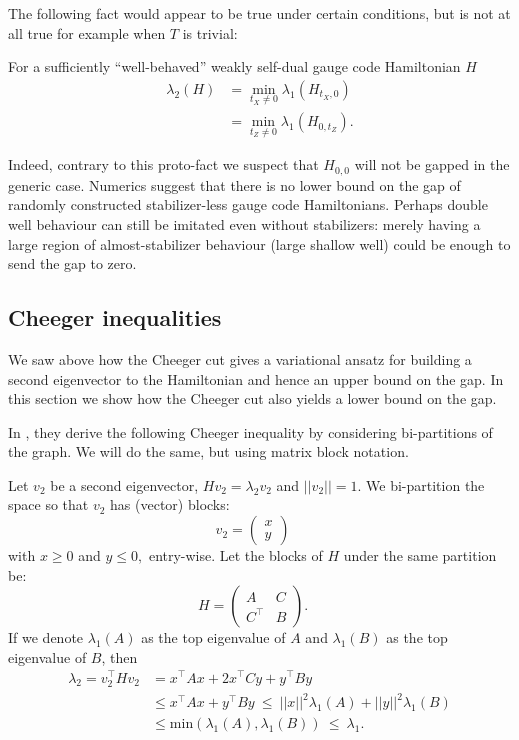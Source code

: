 \documentclass[11pt,oneside]{article}
\def\Ham{H}
\renewenvironment{framed}
{\begin{samepage}
\MakeFramed{\hsize0.8\linewidth\advance\hsize-\width\FrameRestore}}
{\endMakeFramed\end{samepage}}
\begin{document}
The following fact would appear to be true under certain conditions,
but is not at all true for example when $T$ is trivial:
\begin{framed}
For a sufficiently ``well-behaved''
weakly self-dual
gauge code Hamiltonian $H$
\begin{align*}
\lambda_2(\Ham) 
    &= \min_{t_X\ne 0} \lambda_1(\Ham_{t_X,0})\\
    &= \min_{t_Z\ne 0} \lambda_1(\Ham_{0,t_Z}).
\end{align*}
\end{framed}
Indeed, contrary to this proto-fact
we suspect that $H_{0,0}$ will not be gapped in
the generic case. 
Numerics suggest that
there is no lower bound on the gap of 
randomly constructed stabilizer-less gauge code Hamiltonians.
Perhaps double well behaviour can still be imitated even without
stabilizers: merely having a large region of almost-stabilizer
behaviour (large shallow well) could be enough to send the gap to zero.


\subsection{Cheeger inequalities}\label{Sec73}

We saw above how the Cheeger cut gives a variational ansatz
for building a second eigenvector to the Hamiltonian and hence
an upper bound on the gap.
In this section we show how the Cheeger cut also 
yields a lower bound on the gap.

In \cite{Friedland2002}, they derive the following Cheeger inequality
by considering bi-partitions of the graph. We will do the
same, but using matrix block notation.

Let $v_2$ be a second eigenvector, $ \Ham v_2 = \lambda_2 v_2 $ 
and $||v_2||=1$.
We bi-partition the space 
so that $v_2$ has (vector) blocks:
$$
v_2 = \left( \begin{array}{l}
x\\
y\end{array} \right)\quad
$$
with $x\ge 0$ and $y\le 0,$ entry-wise.
Let the blocks of $\Ham$ under the same partition be:
$$
\Ham = \left( \begin{array}{ll}
A&C\\
C^\top&B\end{array} \right).\quad
$$
If we denote $\lambda_1(A)$ as the top eigenvalue of $A$ and
$\lambda_1(B)$ as the top eigenvalue of $B$,
then
\begin{align*}
\lambda_2 = v_2^\top \Ham v_2 &= x^\top A x + 2 x^\top C y + y^\top B y \\
        &\le x^\top A x + y^\top B y\ \le\ ||x||^2 \lambda_1(A) + ||y||^2 \lambda_1(B) \\
        &\le \mbox{min}(\lambda_1(A), \lambda_1(B))\ \le\ \lambda_1.
\end{align*}
\end{document}
